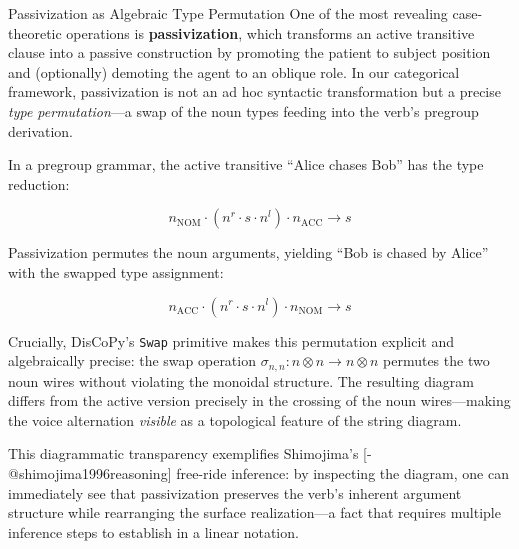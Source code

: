 \documentclass[
  ignorenonframetext,
]{beamer}
\begin{document}
\begin{frame}[fragile]{Passivization as Algebraic Type Permutation}
\protect{}\label{passivization-as-algebraic-type-permutation}
One of the most revealing case-theoretic operations is
\textbf{passivization}, which transforms an active transitive clause
into a passive construction by promoting the patient to subject position
and (optionally) demoting the agent to an oblique role. In our
categorical framework, passivization is not an ad hoc syntactic
transformation but a precise \emph{type permutation}---a swap of the
noun types feeding into the verb's pregroup derivation.

In a pregroup grammar, the active transitive ``Alice chases Bob'' has
the type reduction:

\[n_{\text{NOM}} \cdot (n^r \cdot s \cdot n^l) \cdot n_{\text{ACC}} \to s \tag{3.3}\]

Passivization permutes the noun arguments, yielding ``Bob is chased by
Alice'' with the swapped type assignment:

\[n_{\text{ACC}} \cdot (n^r \cdot s \cdot n^l) \cdot n_{\text{NOM}} \to s \tag{3.4}\]

Crucially, DisCoPy's \texttt{Swap} primitive makes this permutation
explicit and algebraically precise: the swap operation
\(\sigma_{n,n}: n \otimes n \to n \otimes n\) permutes the two noun
wires without violating the monoidal structure. The resulting diagram
differs from the active version precisely in the crossing of the noun
wires---making the voice alternation \emph{visible} as a topological
feature of the string diagram.

This diagrammatic transparency exemplifies Shimojima's
{[}-@shimojima1996reasoning{]} free-ride inference: by inspecting the
diagram, one can immediately see that passivization preserves the verb's
inherent argument structure while rearranging the surface
realization---a fact that requires multiple inference steps to establish
in a linear notation.


\end{frame}
\end{document}
